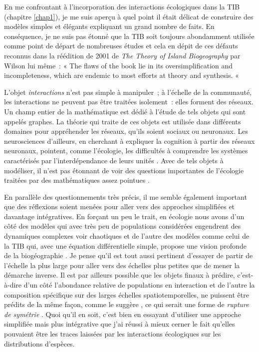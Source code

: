 En me confrontant à l'incorporation des interactions écologiques dans la
TIB (chapitre \ref{chap1}), je me suis aperçu à quel point il était
délicat de construire des modèles simples et élégants expliquant un
grand nombre de faits. En conséquence, je ne suis pas étonné que la TIB
soit toujours abondamment utilisée comme point de départ de nombreuses
études \citep{Warren2015} et cela en dépit de ces défauts reconnus dans
la réédition de 2001 de \emph{The Theory of Island Biogeography} par
Wilson lui même~: « The flaws of the book lie in its oversimplification
and incompleteness, which are endemic to most efforts at theory and
synthesis. «

L'objet \emph{interactions} n'est pas simple à manipuler~; à l'échelle
de la communauté, les interactions ne peuvent pas être traitées
isolement~: elles forment des réseaux. Un champ entier de la
mathématique est dédié à l'étude de tels objets qui sont appelés
graphes. La théorie qui traite de ces objets est utilisée dans
différents domaines pour appréhender les réseaux, qu'ils soient sociaux
ou neuronaux. Les neurosciences d'ailleurs, en cherchant à expliquer la
cognition à partir des réseaux neuronaux, pointent, comme l'écologie,
les difficultés à comprendre les systèmes caractérisés par
l'interdépendance de leurs unités \citep{Park2013}. Avec de tels objets
à modéliser, il n'est pas étonnant de voir des questions importantes de
l'écologie traitées par des mathématiques assez pointues
\citep{Allesina2012a, Rohr2014}.

En parallèle des questionnements très précis, il me semble également
important que des réflexions soient menées pour aller vers des approches
simplifiées et davantage intégratives. En forçant un peu le trait, en
écologie nous avons d'un côté des modèles qui avec très peu de
populations considérées engendrent des dynamiques complexes voir
chaotiques \citep[dont l'existence est validée
expérimentalement][]{Costantino1997b, Fussmann2000} et de l'autre des
modèles comme celui de la TIB qui, avec une équation différentielle
simple, propose une vision profonde de la biogéographie
\citep{MacArthur1967}. Je pense qu'il est tout aussi pertinent d'essayer
de partir de l'échelle la plus large pour aller vers des échelles plus
petites que de mener la démarche inverse. Il est par ailleurs possible
que les objets finaux à prédire, c'est-à-dire d'un côté l'abondance
relative de populations en interaction et de l'autre la composition
spécifique sur des larges échelles spatiotemporelles, ne puissent être
prédits de la même façon, comme le suggère \citet{Lawton1999}, ce qui
serait une forme de \emph{rupture de symétrie} \citep[au sens
de][]{Anderson1972}. Quoi qu'il en soit, c'est bien en essayant
d'utiliser une approche simplifiée mais plus intégrative que j'ai réussi
à mieux cerner le fait qu'elles pouvaient être les traces laissées par
les interactions écologiques sur les distributions d'espèces.

